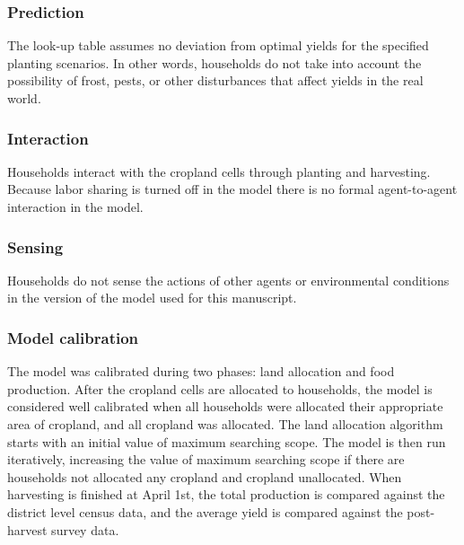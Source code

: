 \documentclass[12pt, titlepage]{article}
\begin{document}
\subsubsection{Prediction} 
The look-up table assumes no deviation from optimal yields for the specified planting scenarios. In other words, households do not take into account the possibility of frost, pests, or other disturbances that affect yields in the real world.

\subsubsection{Interaction} 
Households interact with the cropland cells through planting and harvesting. Because labor sharing is turned off in the model there is no formal agent-to-agent interaction in the model.

\subsubsection{Sensing} 
Households do not sense the actions of other agents or environmental conditions in the version of the model used for this manuscript. 


\subsubsection{Model calibration} 
The model was calibrated during two phases: land allocation and food production. After the cropland cells are allocated to households, the model is considered well calibrated when all households were allocated their appropriate area of cropland, and all cropland was allocated. The land allocation algorithm starts with an initial value of maximum searching scope. The model is then run iteratively, increasing the value of maximum searching scope if there are households not allocated any cropland and cropland unallocated. When harvesting is finished at April 1st, the total production is compared against the district level census data, and the average yield is compared against the post-harvest survey data.

\FloatBarrier
 
{\footnotesize }
\end{document}
